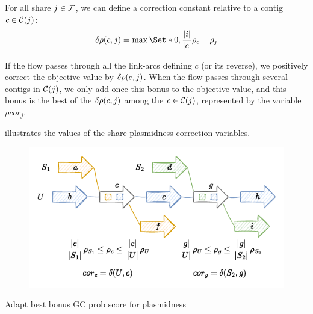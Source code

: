 For all share \(j \in \mathcal{F}{}\), we can define a correction constant relative to a contig \(c \in \mathcal{C}(j)\):
\[
  \dplm{c}{j} = \max \Set*{0, \frac{ |i| }{ |c| }\plm{c} - \plm{j}}
\]

If the flow passes through all the link-arcs defining \(c\) (or its reverse), we positively correct the objective value by \(\delta\rho(c, j)\).
When the flow passes through several contigs in \(\mathcal{C}(j)\), we only add once this bonus to the objective value, and this bonus is the best of the \(\delta\rho(c, j)\) among the \(c \in \mathcal{C}(j)\), represented by the variable \(\rho cor_j\).

 illustrates the values of the share plasmidness correction variables.

\begin{figure}[htb]
  \centering
  \includegraphics[width=0.6\linewidth]{appendix/ideas/panasm_milp_fine_tuning/img/constraints-correct_plasmidness_example.pdf}
  \label{fig:correct_share_plasmidness}
\end{figure}

\begin{todobox}
  Adapt best bonus GC prob score for plasmidness
\end{todobox}